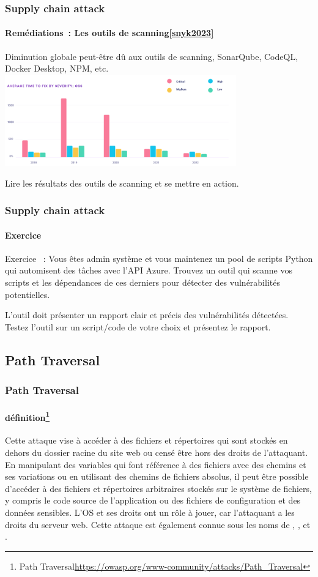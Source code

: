 \documentclass{beamer}
\begin{document}
    \begin{frame}
        \frametitle{Supply chain attack}
        \framesubtitle{Remédiations~: Les outils de scanning\cref{snyk2023}}
        \transdissolve
        Diminution globale peut-être dû aux outils de scanning, SonarQube, CodeQL, Docker Desktop, NPM, etc.
        \bigbreak
        \centering
        \includegraphics[width=10cm]{image/vuln-time-to-fix}
        \flushleft
        \begin{dangercolorbox}
            Lire les résultats des outils de scanning et se mettre en action.
        \end{dangercolorbox}
    \end{frame}

    \begin{frame}
        \frametitle{Supply chain attack}
        \framesubtitle{Exercice}
        Exercice \execcounterdispinc{}~:
        Vous êtes admin système et vous maintenez un pool de scripts Python qui automisent des tâches avec l'API Azure.
        \bigbreak
        Trouvez un outil qui scanne vos scripts et les dépendances de ces derniers pour détecter des vulnérabilités potentielles.

        L'outil doit présenter un rapport clair et précis des vulnérabilités détectées.
        \bigbreak
        Testez l'outil sur un script/code de votre choix et présentez le rapport.
    \end{frame}

    \subsection{Path Traversal}\label{path-traversal}


    \begin{frame}
        \frametitle{Path Traversal}
        \framesubtitle{définition\footnote{Path Traversal\url{https://owasp.org/www-community/attacks/Path_Traversal}}}
        \transdissolve
        Cette attaque vise à accéder à des fichiers et répertoires qui sont stockés en dehors du dossier racine du site web ou censé être hors des droits de l'attaquant.
        En manipulant des variables qui font référence à des fichiers avec des chemins  et ses variations ou en utilisant des chemins de fichiers absolus, il peut être possible d'accéder à des fichiers et répertoires arbitraires stockés sur le système de fichiers, y compris le code source de l'application ou des fichiers de configuration et des données sensibles.
        L'OS et ses droits ont un rôle à jouer, car l'attaquant a les droits du serveur web.
        \bigbreak
        Cette attaque est également connue sous les noms de , ,  et .
    \end{frame}
\end{document}

